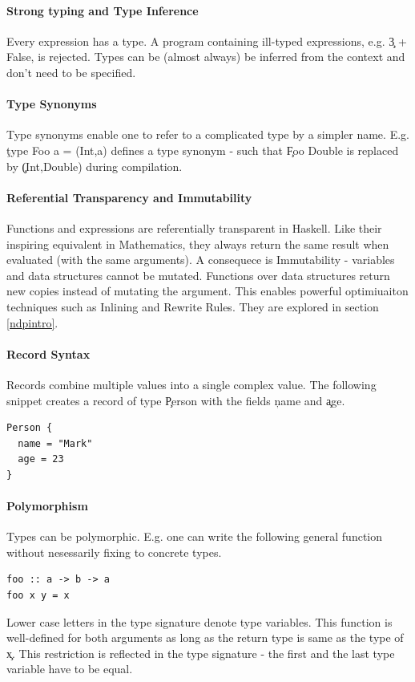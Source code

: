   \paragraph{Strong typing and Type Inference}
    Every expression has a type. A program containing
    ill-typed expressions, e.g. \c{3 + False}, is rejected.
    Types can be (almost always) be inferred from the context and
    don't need to be specified.
  \paragraph{Type Synonyms}
    Type synonyms enable one to refer to a complicated type by a simpler name.
    E.g. \c{type Foo a = (Int,a)} defines a type synonym - such that
    \c{Foo Double} is replaced by \c{(Int,Double)} during compilation.
  
  \paragraph{Referential Transparency and Immutability}
    Functions and expressions are referentially transparent in Haskell.
    Like their inspiring equivalent in Mathematics, they always return
    the same result when evaluated (with the same arguments).
    A consequece is Immutability - variables and data structures
    cannot be mutated. Functions over data structures return
    new copies instead of mutating the argument. This enables
    powerful optimiuaiton techniques such as Inlining and Rewrite Rules.
    They are explored in section \ref{ndpintro}.
    
  \paragraph{Record Syntax}
    Records combine multiple values into a single complex value.
    The following snippet creates a record of type \c{Person} with the
    fields \c{name} and \c{age}.
    \begin{lstlisting}
Person {
  name = "Mark"
  age = 23
}
    \end{lstlisting}
    
  \paragraph{Polymorphism}
    Types can be polymorphic. 
    E.g. one can write the following general function
    without nesessarily fixing to concrete types.
    \begin{lstlisting}
foo :: a -> b -> a
foo x y = x
    \end{lstlisting}
    Lower case letters in the type signature denote type variables.
    This function is well-defined for both arguments
    as long as the return type is same as the type of \c{x}. This
    restriction is reflected in the type signature - the first and
    the last type variable have to be equal. 
    
